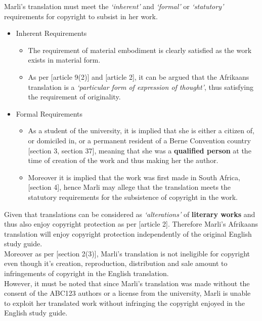 \documentclass[11pt]{article}
\begin{document}
Marli's translation must meet the \emph{`inherent'} and \emph{`formal'} or
\emph{`statutory'} requirements for copyright to subsist in her work.
\begin{itemize}
\item Inherent Requirements
\begin{itemize}
\item The requirement of material embodiment is clearly satisfied as the
work exists in material form.
\item As per [article 9(2)]\cite{wto17_trips} and
[article 2]\cite{wipo96_copyright_treaty}, it can be argued that the
Afrikaans translation is a \emph{`particular form of expression of
thought'}, thus satisfying the requirement of originality.
\end{itemize}
\item Formal Requirements
\begin{itemize}
\item As a student of the university, it is implied that she is either a
citizen of, or domiciled in, or a permanent resident of a Berne
Convention country [section 3, section 37]\cite{wipo86_berne},
meaning that she was a \textbf{qualified person} at the time of creation
of the work and thus making her the author.
\item Moreover it is implied that the work was first made in South
Africa, [section 4]\cite{rsa78_copyrightact}, hence Marli may allege
that the translation meets the statutory requirements for the
subsistence of copyright in the work.
\end{itemize}
\end{itemize}

Given that translations can be considered as \emph{`alterations'} of
\textbf{literary works} and thus also enjoy copyright protection as per
[article 2]\cite{wipo86_berne}. Therefore Marli's Afrikaans translation
will enjoy copyright protection independently of the original English
study guide.\\

Moreover as per [section 2(3)]\cite{rsa78_copyrightact}, Marli's
translation is not ineligible for copyright even though it's creation,
reproduction, distribution and sale amount to infringements of
copyright in the English translation.\\

However, it must be noted that since Marli's translation was made
without the consent of the ABC123 authors or a license from the
university, Marli is unable to exploit her translated work without
infringing the copyright enjoyed in the English study guide.
\printbibliography
\end{document}
